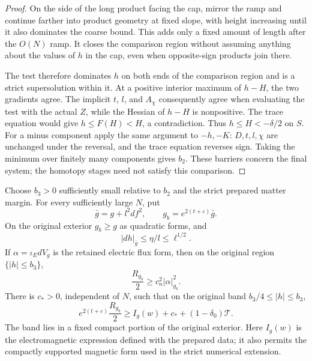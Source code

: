 \begin{proof}
On the side of the long product facing the cap, mirror the ramp
and continue farther into product geometry at fixed slope, with
height increasing until it also dominates the coarse bound.
This adds only a fixed amount of length after the \(O(N)\) ramp.
It closes the comparison region without assuming anything about
the values of \(h\) in the cap, even when opposite-sign products
join there.

The test therefore dominates \(h\) on both ends of the comparison
region and is a strict supersolution within it.
At a positive interior maximum of \(h-H\), the two gradients agree.
The implicit \(t\), \(l\), and \(A_\chi\) consequently agree when
evaluating the test with the actual \(Z\), while the Hessian of
\(h-H\) is nonpositive.  The trace equation would give
\(h\le F(H)<H\), a contradiction.
Thus \(h\le H<-\delta/2\) on \(S\).
For a minus component apply the same argument to \(-h,-K\):
\(D,t,l,\chi\) are unchanged under the reversal, and the trace
equation reverses sign.  Taking the minimum over finitely many
components gives \(b_2\).  These barriers concern the final system;
the homotopy stages need not satisfy this comparison.
\end{proof}

\begin{proposition}
\label{pde:charged-region}
Choose \(b_3>0\) sufficiently small relative to \(b_2\) and the
strict prepared matter margin.  For every sufficiently large \(N\),
put
\[
 \bar g=g+l^2df^2,\qquad
 g_b=e^{2(t+\varepsilon)}\bar g.
\]
On the original exterior \(g_b\ge g\) as quadratic forms, and
\[
 |dh|_{\bar g}\le\eta/l\le\ell^{1/2}.
\]
If \(\alpha=\iota_EdV_g\) is the retained electric flux form, then
on the original region \(\{|h|\le b_3\}\),
\begin{equation}
 \frac{R_{g_b}}2\ge c_n^2|\alpha|_{g_b}^2.
 \label{pde:charged-curvature}
\end{equation}
There is \(c_*>0\), independent of \(N\), such that on the original
band \(b_3/4\le|h|\le b_3\),
\begin{equation}
 e^{2(t+\varepsilon)}\frac{R_{g_b}}2
 \ge I_g(w)+c_*+(1-\delta_0)\mathcal T.
 \label{pde:retained-band}
\end{equation}
The band lies in a fixed compact portion of the original exterior.
Here \(I_g(w)\) is the electromagnetic expression defined with the
prepared data; it also permits the compactly supported magnetic form
used in the strict numerical extension.
\end{proposition}

